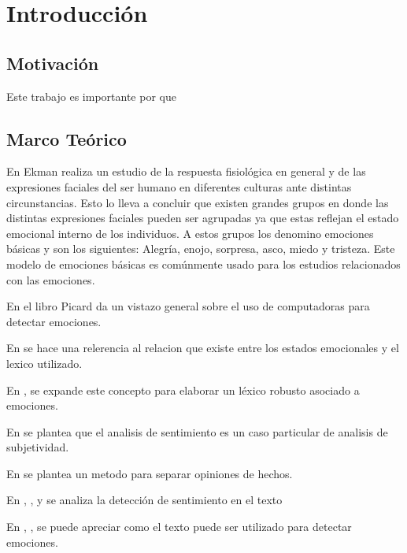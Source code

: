 \chapter{Introducción}






\section{Motivación}

Este trabajo es importante por que 



\section{Marco Teórico}

En \cite{ekman1993facial} Ekman realiza un estudio de la respuesta fisiológica en general y de las  expresiones faciales del ser humano en diferentes culturas ante distintas circunstancias. Esto lo lleva a concluir que existen grandes grupos en donde las distintas expresiones faciales pueden ser agrupadas ya que estas reflejan el estado emocional interno de los individuos. A estos grupos los denomino emociones básicas y son los siguientes: Alegría, enojo, sorpresa, asco, miedo y tristeza. Este modelo de emociones básicas es comúnmente usado para los estudios relacionados con las emociones.

En el libro \cite{picard2000affective} Picard da un vistazo general sobre el uso de computadoras para detectar emociones.

En \cite{ortony1987referential} se hace una relerencia al relacion que existe entre los estados emocionales y el lexico utilizado.


En \cite{hatzivassiloglou1997predicting}, \cite{strapparava2004wordnet}  se expande este concepto para elaborar un léxico robusto asociado a emociones.

En \cite{wiebe1994tracking} se plantea que el analisis de sentimiento es un caso particular de analisis de subjetividad.


En \cite{yu2003towards} se plantea un metodo para separar opiniones de hechos.





En \cite{pang2002thumbs}, \cite{turney2002thumbs},  y  se analiza la detección de sentimiento en el texto

En \cite{wiebe2005annotating}, \cite{alm2005emotions},\cite{aman2007identifying}  se puede apreciar como el texto puede ser utilizado para detectar emociones.

